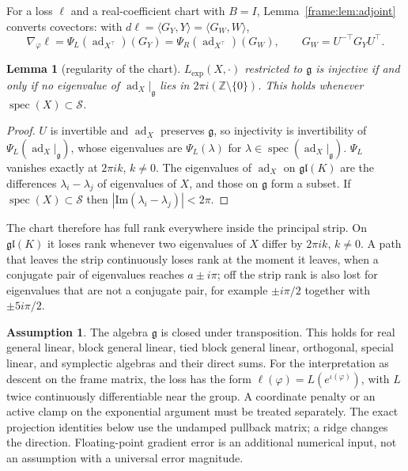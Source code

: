 \documentclass[11pt]{article}
\newtheorem{lemma}[theorem]{Lemma}
\theoremstyle{definition}
\newtheorem{assumption}[theorem]{Assumption}
\theoremstyle{remark}
\providecommand{\gl}{\mathfrak{gl}}
\providecommand{\ad}{\operatorname{ad}}
\providecommand{\g}{\mathfrak{g}}
\providecommand{\spec}{\operatorname{spec}}
\providecommand{\ip}[2]{\langle #1, #2\rangle}
\begin{document}
For a loss $\ell$ and a real-coefficient chart with $B=I$, Lemma~\ref{frame:lem:adjoint} converts covectors: with $d\ell=\ip{G_Y}{Y}=\ip{G_W}{W}$,
\begin{equation}\label{frame:eq:covectors}
\nabla_\varphi\ell=\Psi_L(\ad_{X^\top})(G_Y)=\Psi_R(\ad_{X^\top})(G_W),\qquad G_W=U^{-\top}G_YU^{\top}.
\end{equation}

\begin{lemma}[regularity of the chart]\label{frame:lem:regular}
$L_{\exp}(X,\cdot)$ restricted to $\g$ is injective if and only if no eigenvalue of $\ad_X|_\g$ lies in $2\pi i(\mathbb{Z}\setminus\{0\})$. This holds whenever $\spec(X)\subset\mathcal{S}$.
\end{lemma}
\begin{proof}
$U$ is invertible and $\ad_X$ preserves $\g$, so injectivity is invertibility of $\Psi_L(\ad_X|_\g)$, whose eigenvalues are $\Psi_L(\lambda)$ for $\lambda\in\spec(\ad_X|_\g)$. $\Psi_L$ vanishes exactly at $2\pi ik$, $k\neq0$. The eigenvalues of $\ad_X$ on $\gl(K)$ are the differences $\lambda_i-\lambda_j$ of eigenvalues of $X$, and those on $\g$ form a subset. If $\spec(X)\subset\mathcal{S}$ then $|\mathrm{Im}(\lambda_i-\lambda_j)|<2\pi$.
\end{proof}

The chart therefore has full rank everywhere inside the principal strip. On $\gl(K)$ it loses rank whenever two eigenvalues of $X$ differ by $2\pi ik$, $k\neq0$. A path that leaves the strip continuously loses rank at the moment it leaves, when a conjugate pair of eigenvalues reaches $a\pm i\pi$; off the strip rank is also lost for eigenvalues that are not a conjugate pair, for example $\pm i\pi/2$ together with $\pm5i\pi/2$.

\begin{assumption}\label{frame:ass:main}
The algebra \(\g\) is closed under transposition. This holds for real general linear, block general linear, tied block general linear, orthogonal, special linear, and symplectic algebras and their direct sums. For the interpretation as descent on the frame matrix, the loss has the form \(\ell(\varphi)=L(e^{\iota(\varphi)})\), with \(L\) twice continuously differentiable near the group. A coordinate penalty or an active clamp on the exponential argument must be treated separately. The exact projection identities below use the undamped pullback matrix; a ridge changes the direction. Floating-point gradient error is an additional numerical input, not an assumption with a universal error magnitude.
\end{assumption}
\end{document}
